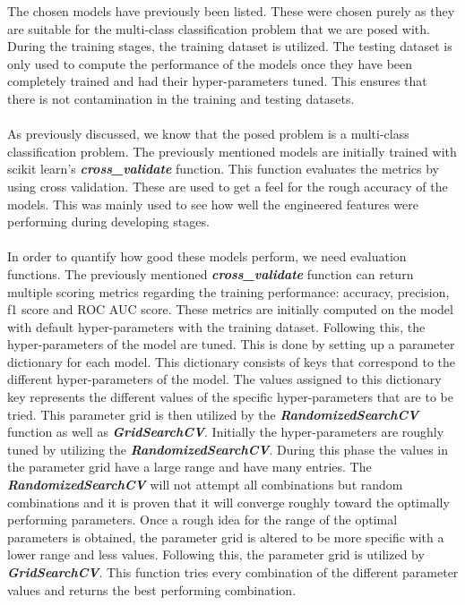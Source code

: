 \documentclass[a4paper,12pt]{article}
\begin{document}
	The chosen models have previously been listed. These were chosen purely as they are suitable for the multi-class classification problem that we are posed with. During the training stages, the training dataset is utilized. The testing dataset is only used to compute the performance of the models once they have been completely trained and had their hyper-parameters tuned. This ensures that there is not contamination in the training and testing datasets.\\
	\\
	As previously discussed, we know that the posed problem is a multi-class classification problem. The previously mentioned models are initially trained with scikit learn’s \textbf{\textit{cross\_validate}} function. This function evaluates the metrics by using cross validation. These are used to get a feel for the rough accuracy of the models. This was mainly used to see how well the engineered features were performing during developing stages. \\
	\\
	In order to quantify how good these models perform, we need evaluation functions. The previously mentioned \textbf{\textit{cross\_validate}} function can return multiple scoring metrics regarding the training performance: accuracy, precision, f1 score and ROC AUC score. These metrics are initially computed on the model with default hyper-parameters with the training dataset. Following this, the hyper-parameters of the model are tuned. This is done by setting up a parameter dictionary for each model. This dictionary consists of keys that correspond to the different hyper-parameters of the model. The values assigned to this dictionary key represents the different values of the specific hyper-parameters that are to be tried. This parameter grid is then utilized by the \textbf{\textit{RandomizedSearchCV}} function as well as \textbf{\textit{GridSearchCV}}. Initially the hyper-parameters are roughly tuned by utilizing the \textbf{\textit{RandomizedSearchCV}}. During this phase the values in the parameter grid have a large range and have many entries. The \textbf{\textit{RandomizedSearchCV}} will not attempt all combinations but random combinations and it is proven that it will converge roughly toward the optimally performing parameters. Once a rough idea for the range of the optimal parameters is obtained, the parameter grid is altered to be more specific with a lower range and less values. Following this, the parameter grid is utilized by \textbf{\textit{GridSearchCV}}. This function tries every combination of the different parameter values and returns the best performing combination. \\
\end{document}
